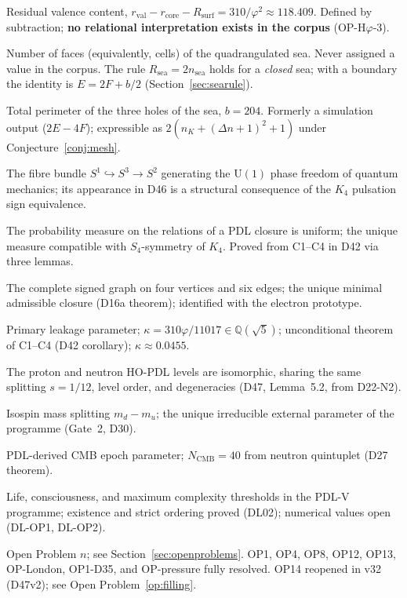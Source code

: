 \documentclass[11pt,a4paper]{article}
\newcommand{\Rsea}{R_{\mathrm{sea}}}
\newcommand{\Rres}{R_{\mathrm{res}}}
\theoremstyle{plain}
\theoremstyle{definition}
\theoremstyle{remark}
\newcommand{\rval}{r_{\mathrm{val}}}
\newcommand{\Rsurf}{R_{\mathrm{surf}}}
\begin{document}
\begin{description}[leftmargin=3.5cm, style=nextline]
\item[$\Rres$] Residual valence content, $\rval-r_{\mathrm{core}}-\Rsurf=310/\varphi^2\approx118.409$. Defined by subtraction; \textbf{no relational interpretation exists in the corpus} (OP-H$\varphi$-3).
\item[$n_{\mathrm{sea}}$] Number of faces (equivalently, cells) of the quadrangulated sea. Never assigned a value in the corpus. The rule $\Rsea=2n_{\mathrm{sea}}$ holds for a \emph{closed} sea; with a boundary the identity is $E=2F+b/2$ (Section~\ref{sec:searule}).
\item[$b$] Total perimeter of the three holes of the sea, $b=204$. Formerly a simulation output ($2E-4F$); expressible as $2(n_K+(\Delta n+1)^2+1)$ under Conjecture~\ref{conj:mesh}.
\item[Hopf fibration] The fibre bundle $S^1\hookrightarrow S^3\to S^2$ generating the $\mathrm{U}(1)$ phase freedom of quantum mechanics; its appearance in D46 is a structural consequence of the $K_4$ pulsation sign equivalence.
\item[Indifference Lemma (H3)] The probability measure on the relations of a PDL closure is uniform; the unique measure compatible with $S_4$-symmetry of $K_4$. Proved from C1--C4 in D42 via three lemmas.
\item[$K_4$] The complete signed graph on four vertices and six edges; the unique minimal admissible closure (D16a theorem); identified with the electron prototype.
\item[$\kappa$] Primary leakage parameter; $\kappa=310\varphi/11017\in\mathbb{Q}(\sqrt{5})$; unconditional theorem of C1--C4 (D42 corollary); $\kappa\approx 0.0455$.
\item[Mirror Lemma] The proton and neutron HO-PDL levels are isomorphic, sharing the same splitting $s=1/12$, level order, and degeneracies (D47, Lemma~5.2, from D22-N2).
\item[$m_{\mathrm{iso}}$] Isospin mass splitting $m_d-m_u$; the unique irreducible external parameter of the programme (Gate~2, D30).
\item[$N_{\mathrm{CMB}}$] PDL-derived CMB epoch parameter; $N_{\mathrm{CMB}}=40$ from neutron quintuplet (D27 theorem).
\item[$n^*_{\mathrm{life}}$, $n^*_{\mathrm{consciousness}}$, $n^*_{\mathrm{max}}$] Life, consciousness, and maximum complexity thresholds in the PDL-V programme; existence and strict ordering proved (DL02); numerical values open (DL-OP1, DL-OP2).
\item[OP$n$] Open Problem $n$; see Section~\ref{sec:openproblems}. OP1, OP4, OP8, OP12, OP13, OP-London, OP1-D35, and OP-pressure fully resolved. OP14 reopened in v32 (D47v2); see Open Problem~\ref{op:filling}.

\end{description}
\end{document}
